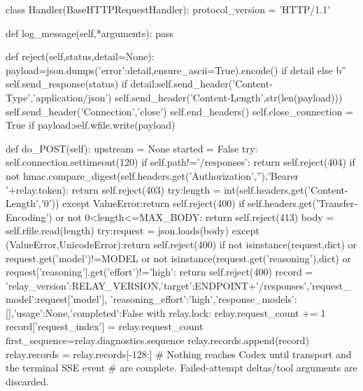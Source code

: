         class Handler(BaseHTTPRequestHandler):
            protocol_version = 'HTTP/1.1'

            def log_message(self,*arguments):
                pass

            def reject(self,status,detail=None):
                payload=json.dumps({'error':detail},ensure_ascii=True).encode() if detail else b''
                self.send_response(status)
                if detail:self.send_header('Content-Type','application/json')
                self.send_header('Content-Length',str(len(payload)))
                self.send_header('Connection','close')
                self.end_headers()
                self.close_connection = True
                if payload:self.wfile.write(payload)

            def do_POST(self):
                upstream = None
                started = False
                try:
                    self.connection.settimeout(120)
                    if self.path!='/responses':
                        return self.reject(404)
                    if not hmac.compare_digest(self.headers.get('Authorization',''),'Bearer '+relay.token):
                        return self.reject(403)
                    try:length = int(self.headers.get('Content-Length','0'))
                    except ValueError:return self.reject(400)
                    if self.headers.get('Transfer-Encoding') or not 0<length<=MAX_BODY:
                        return self.reject(413)
                    body = self.rfile.read(length)
                    try:request = json.loads(body)
                    except (ValueError,UnicodeError):return self.reject(400)
                    if not isinstance(request,dict) or request.get('model')!=MODEL or not isinstance(request.get('reasoning'),dict) or request['reasoning'].get('effort')!='high':
                        return self.reject(400)
                    record = {'relay_version':RELAY_VERSION,'target':ENDPOINT+'/responses','request_model':request['model'],
                              'reasoning_effort':'high','response_models':[],'usage':None,'completed':False}
                    with relay.lock:
                        relay.request_count += 1
                        record['request_index'] = relay.request_count
                        first_sequence=relay.diagnostics.sequence
                        relay.records.append(record)
                        relay.records = relay.records[-128:]
                    # Nothing reaches Codex until transport and the terminal SSE event
                    # are complete. Failed-attempt deltas/tool arguments are discarded.
